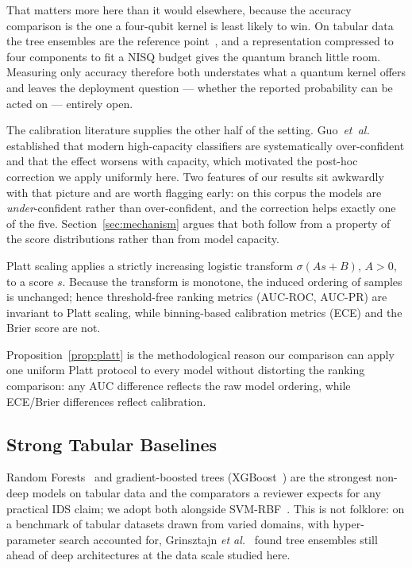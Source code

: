 \documentclass[journal]{IEEEtran}
\begin{document}
That matters more here than it would elsewhere, because the accuracy
comparison is the one a four-qubit kernel is least likely to win. On tabular
data the tree ensembles are the reference
point~\cite{breiman2001rf,chen2016xgboost}, and a representation compressed
to four components to fit a NISQ budget gives the quantum branch little room.
Measuring only accuracy therefore both understates what a quantum kernel
offers and leaves the deployment question --- whether the reported
probability can be acted on --- entirely open.

The calibration literature supplies the other half of the setting.
Guo~\emph{et~al.}~\cite{guo2017calibration} established that modern
high-capacity classifiers are systematically over-confident and that the
effect worsens with capacity, which motivated the post-hoc correction we
apply uniformly here. Two features of our results sit awkwardly with that
picture and are worth flagging early: on this corpus the models are
\emph{under}-confident rather than over-confident, and the correction helps
exactly one of the five. Section~\ref{sec:mechanism} argues that both
follow from a property of the score distributions rather than from model
capacity.

\begin{proposition}
\label{prop:platt}
Platt scaling applies a strictly increasing logistic transform
$\sigma(As+B)$, $A{>}0$, to a score $s$. Because the transform is
monotone, the induced ordering of samples is unchanged; hence
threshold-free ranking metrics (AUC-ROC, AUC-PR) are invariant to Platt
scaling, while binning-based calibration metrics (ECE) and the Brier
score are not.
\end{proposition}
Proposition~\ref{prop:platt} is the methodological reason our comparison
can apply one uniform Platt protocol to every model without distorting
the ranking comparison: any AUC difference reflects the raw model
ordering, while ECE/Brier differences reflect calibration.

\subsection{Strong Tabular Baselines}
Random Forests~\cite{breiman2001rf} and gradient-boosted trees
(XGBoost~\cite{chen2016xgboost}) are the strongest non-deep models on
tabular data and the comparators a reviewer expects for any practical IDS
claim; we adopt both alongside SVM-RBF~\cite{cortes1995svm}. This is not
folklore: on a benchmark of tabular datasets drawn from varied domains,
with hyper-parameter search accounted for, Grinsztajn \emph{et
al.}~\cite{grinsztajn2022tabular} found tree ensembles still ahead of deep
architectures at the data scale studied here.
\end{document}
